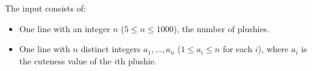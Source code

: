 
    The input consists of:
    \begin{itemize}
        \item One line with an integer $n$ ($5 \leq n \leq 1000$), the number of plushies.
        \item One line with $n$ distinct integers $a_1, \ldots, a_n$ ($1 \le a_i \le n$ for each $i$), where $a_i$ is the cuteness value of the $i$th plushie.
    \end{itemize}
